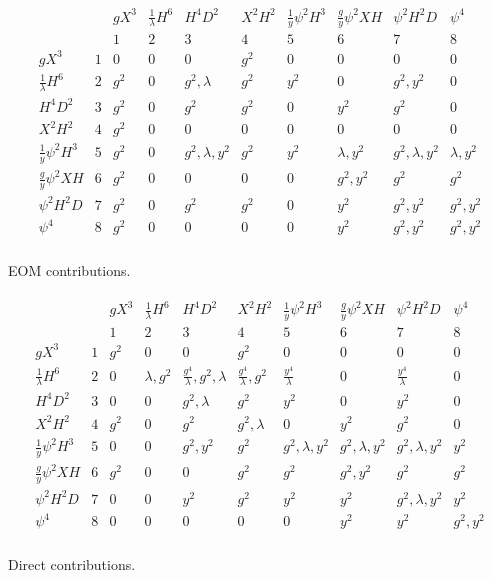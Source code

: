 \documentclass[11pt]{article}
\begin{document}
 

\begin{table}
\renewcommand{\arraycolsep}{0.15cm}
\renewcommand{\arraystretch}{1.5}
\begin{align*}
\begin{array}{cc|cccccccc}
&& g X^3 & \frac{1}{\lambda}H^6 & H^4 D^2 & X^2 H^2 & \frac{1}{y}\psi^2 H^3 &\frac{g}{y} \psi^2 X H & \psi^2 H^2 D & \psi^4 \\
&& 1 & 2 & 3 & 4 & 5 & 6 & 7 & 8\\
\hline
%
%
g X^3 & 1 & 0 & 0 & 0 &g^2 & 0 & 0 & 0 & 0 \\
\frac{1}{\lambda} H^6 & 2 & g^2 & 0 & g^2,\lambda & g^2 & y^2 & 0 & g^2, y^2 & 0 \\
H^4 D^2 & 3 & g^2 & 0 & g^2  &g^2  & 0 & y^2  & g^2 & 0 \\
 X^2 H^2 & 4 &  g^2 & 0 & 0 &  0  & 0 & 0 & 0 & 0 \\
\frac{1}{y} \psi^2 H^3 & 5 & g^2 & 0 & g^2,\lambda,y^2 &  g^2  & y^2 & \lambda, y^2 & g^2,\lambda,y^2 & \lambda,y^2 \\
\frac{g}{y} \psi^2 X H & 6 & g^2  & 0 & 0 &  0 & 0 & g^2, y^2 & g^2  &  g^2 \\
\psi^2 H^2 D & 7 & g^2 & 0 & g^2 &  g^2  & 0 & y^2 & g^2,y^2 & g^2,y^2 \\
\psi^4 & 8 & g^2 & 0 & 0 &  0 & 0 & y^2 & g^2,y^2 & g^2,y^2 \\
\end{array}
\end{align*}
\caption{EOM contributions.}
\begin{align*}
\begin{array}{cc|cccccccc}
&& g X^3 & \frac{1}{\lambda}H^6 & H^4 D^2 & X^2 H^2 & \frac{1}{y}\psi^2 H^3 &\frac{g}{y} \psi^2 X H & \psi^2 H^2 D & \psi^4 \\
&& 1 & 2 & 3 & 4 & 5 & 6 & 7 & 8\\
\hline
%
%
g X^3 & 1 & g^2 & 0 & 0 & g^2 & 0 & 0 & 0 & 0 \\
\frac{1}{\lambda}H^6 & 2 & 0 & \lambda, g^2 & \frac{g^4}{\lambda},g^2 ,\lambda &  \frac{g^4}{\lambda},g^2  & \frac{y^4}{\lambda} & 0 & \frac{y^4}{\lambda} & 0 \\
H^4 D^2 & 3 & 0 & 0 & g^2 ,\lambda &  g^2 & y^2 & 0 & y^2 & 0 \\
X^2 H^2 & 4 &  g^2 & 0 & g^2 &  g^2,\lambda & 0 & y^2 & g^2 & 0 \\
\frac{1}{y}\psi^2 H^3 & 5 & 0 & 0 & g^2,y^2 &  g^2  &g^2, \lambda,y^2 & g^2, \lambda,y^2 & g^2 , \lambda  , y^2 & y^2 \\
\frac{g}{y}\psi^2 X H & 6 & g^2  & 0 & 0 &  g^2 & g^2 & g^2,y^2 & g^2 & g^2 \\
\psi^2 H^2 D & 7 & 0 & 0 & y^2 &  g^2 & y^2 & y^2 & g^2,\lambda,y^2 & y^2 \\
\psi^4 & 8 & 0 & 0 & 0 &  0 & 0 & y^2 & y^2 & g^2,y^2 \\
\end{array}
\end{align*}
\caption{Direct contributions.}
\end{table}
\end{document}
